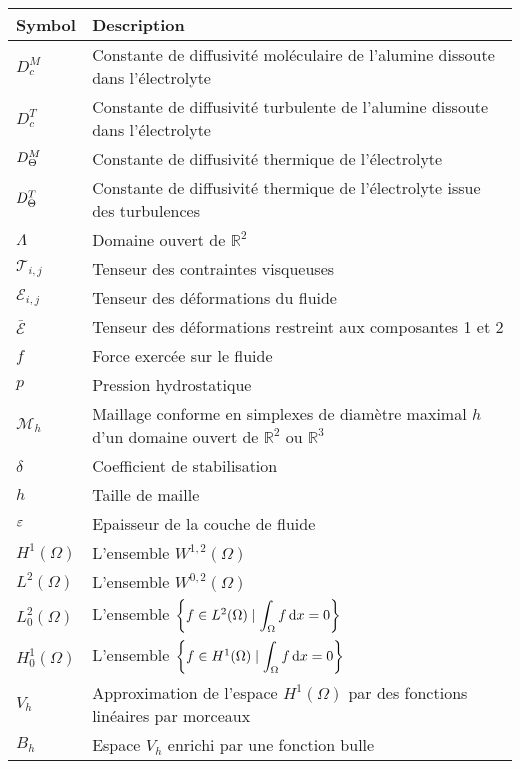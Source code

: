 \begin{tabularx}{\textwidth}{@{}ll@{}}
  \toprule
  Symbol & Description \\
  \midrule
  $D_c^M$ & Constante de diffusivité moléculaire de l'alumine dissoute dans l'électrolyte\\
  $D_c^T$ & Constante de diffusivité turbulente de l'alumine dissoute dans l'électrolyte\\
  $D_\Theta^M$ & Constante de diffusivité thermique de l'électrolyte\\
  $D_\Theta^T$ & Constante de diffusivité thermique de l'électrolyte issue des turbulences\\
  $\Lambda$ & Domaine ouvert de $\mathbb R^2$\\
  $\mathcal T_{i,j}$ & Tenseur des contraintes visqueuses \\
  $\mathcal E_{i,j}$ & Tenseur des déformations du fluide \\
  $\bar{\mathcal E}$ & Tenseur des déformations restreint aux composantes 1 et 2 \\
  $f$ & Force exercée sur le fluide \\
  $p$ & Pression hydrostatique \\
  $\mathcal M_h$ & Maillage conforme en simplexes de diamètre maximal $h$ d'un domaine ouvert de $\mathbb R^2$ ou $\mathbb R^3$\\
  $\delta$ & Coefficient de stabilisation \\
  $h$ & Taille de maille \\
  $\varepsilon$ & Epaisseur de la couche de fluide \\
  $H^1(\Omega)$ & L'ensemble $W^{1, 2}(\Omega)$\\
  $L^2(\Omega)$ & L'ensemble $W^{0, 2}(\Omega)$\\
  $L^2_0(\Omega)$ & L'ensemble $\left\{ f \in L^2(\Omega) \mid \displaystyle\int_\Omega f\,\mathrm dx = 0 \right\}$\\
  $H^1_0(\Omega)$ & L'ensemble $\left\{ f \in H^1(\Omega) \mid \displaystyle\int_\Omega f\,\mathrm dx = 0 \right\}$\\
  $V_h$ & Approximation de l'espace $H^1(\Omega)$ par des fonctions linéaires par morceaux\\
  $B_h$ & Espace $V_h$ enrichi par une fonction bulle\\
  \bottomrule
\end{tabularx}
